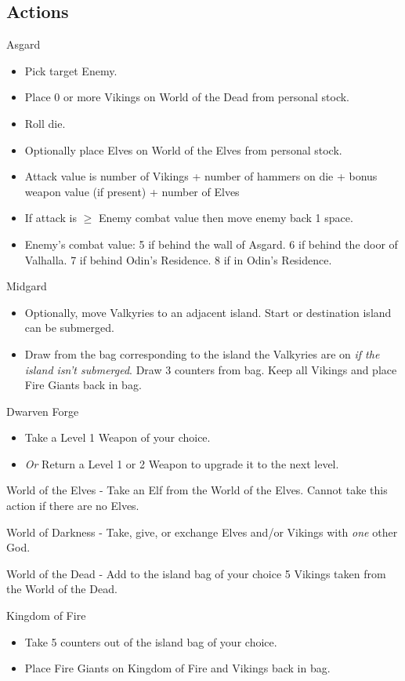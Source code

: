\documentclass[12pt]{article}
\newenvironment{itemizeCustom}
{\begin{itemize}
  \setlength{\itemsep}{1pt}
  \setlength{\parskip}{0pt}
  \setlength{\parsep}{0pt}}
{\end{itemize}}
\begin{document}
\begin{mdframed}[style = customFrame]
\begin{multicols*}{2}
\section*{Actions}
Asgard
\begin{itemizeCustom}
	\item Pick target Enemy.
	\item Place 0 or more Vikings on World of the Dead from personal stock.
	\item Roll die.
	\item Optionally place Elves on World of the Elves from personal stock.
	\item Attack value is number of Vikings + number of hammers on die + bonus weapon value (if present) + number of Elves
	\item If attack is $\ge$ Enemy combat value then move enemy back 1 space.
	\item Enemy's combat value: 5 if behind the wall of Asgard. 6 if behind the door of Valhalla. 7 if behind Odin's Residence. 8 if in Odin's Residence.
\end{itemizeCustom}

\noindent
Midgard
\begin{itemizeCustom}
	\item Optionally, move Valkyries to an adjacent island. Start or destination island can be submerged.
	\item Draw from the bag corresponding to the island the Valkyries are on \emph{if the island isn't submerged}. Draw 3 counters from bag. Keep all Vikings and place Fire Giants back in bag.
\end{itemizeCustom}

\noindent
Dwarven Forge
\begin{itemizeCustom}
	\item Take a Level 1 Weapon of your choice.
	\item \emph{Or} Return a Level 1 or 2 Weapon to upgrade it to the next level.
\end{itemizeCustom}

\noindent
World of the Elves - Take an Elf from the World of the Elves. Cannot take this action if there are no Elves.

\noindent
World of Darkness - Take, give, or exchange Elves and/or Vikings with \emph{one} other God.

\noindent
World of the Dead - Add to the island bag of your choice 5 Vikings taken from the World of the Dead.

\noindent
Kingdom of Fire 
\begin{itemizeCustom}
	\item Take 5 counters out of the island bag of your choice. 
	\item Place Fire Giants on Kingdom of Fire and Vikings back in bag.
\end{itemizeCustom}


\end{multicols*}
\end{mdframed}
\end{document}
